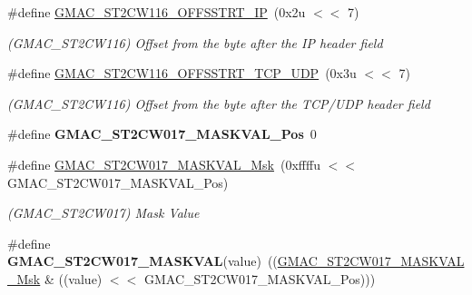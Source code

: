 \begin{DoxyCompactItemize}
\mbox{\label{group__SAMV71__GMAC_ga33125f0251c6cc5e3bc26ef42db01072}} 
\#define \mbox{\hyperlink{group__SAMV71__GMAC_ga33125f0251c6cc5e3bc26ef42db01072}{G\+M\+A\+C\+\_\+\+S\+T2\+C\+W116\+\_\+\+O\+F\+F\+S\+S\+T\+R\+T\+\_\+\+IP}}~(0x2u $<$$<$ 7)
\begin{DoxyCompactList}\small\item\em (G\+M\+A\+C\+\_\+\+S\+T2\+C\+W116) Offset from the byte after the IP header field \end{DoxyCompactList}\item 
\mbox{\label{group__SAMV71__GMAC_ga0245ebf84f81ff1255ed6a1c0917950f}} 
\#define \mbox{\hyperlink{group__SAMV71__GMAC_ga0245ebf84f81ff1255ed6a1c0917950f}{G\+M\+A\+C\+\_\+\+S\+T2\+C\+W116\+\_\+\+O\+F\+F\+S\+S\+T\+R\+T\+\_\+\+T\+C\+P\+\_\+\+U\+DP}}~(0x3u $<$$<$ 7)
\begin{DoxyCompactList}\small\item\em (G\+M\+A\+C\+\_\+\+S\+T2\+C\+W116) Offset from the byte after the T\+C\+P/\+U\+DP header field \end{DoxyCompactList}\item 
\mbox{\label{group__SAMV71__GMAC_ga10719b7caa03b4d8f0dc9a3e4761f84b}} 
\#define {\bfseries G\+M\+A\+C\+\_\+\+S\+T2\+C\+W017\+\_\+\+M\+A\+S\+K\+V\+A\+L\+\_\+\+Pos}~0
\item 
\mbox{\label{group__SAMV71__GMAC_ga8400a07b92154c52704ccddb7feeb480}} 
\#define \mbox{\hyperlink{group__SAMV71__GMAC_ga8400a07b92154c52704ccddb7feeb480}{G\+M\+A\+C\+\_\+\+S\+T2\+C\+W017\+\_\+\+M\+A\+S\+K\+V\+A\+L\+\_\+\+Msk}}~(0xffffu $<$$<$ G\+M\+A\+C\+\_\+\+S\+T2\+C\+W017\+\_\+\+M\+A\+S\+K\+V\+A\+L\+\_\+\+Pos)
\begin{DoxyCompactList}\small\item\em (G\+M\+A\+C\+\_\+\+S\+T2\+C\+W017) Mask Value \end{DoxyCompactList}\item 
\mbox{\label{group__SAMV71__GMAC_ga0388c54b60fcdcd56d7dd09fa82a135d}} 
\#define {\bfseries G\+M\+A\+C\+\_\+\+S\+T2\+C\+W017\+\_\+\+M\+A\+S\+K\+V\+AL}(value)~((\mbox{\hyperlink{group__SAMV71__GMAC_ga8400a07b92154c52704ccddb7feeb480}{G\+M\+A\+C\+\_\+\+S\+T2\+C\+W017\+\_\+\+M\+A\+S\+K\+V\+A\+L\+\_\+\+Msk}} \& ((value) $<$$<$ G\+M\+A\+C\+\_\+\+S\+T2\+C\+W017\+\_\+\+M\+A\+S\+K\+V\+A\+L\+\_\+\+Pos)))

\end{DoxyCompactItemize}
